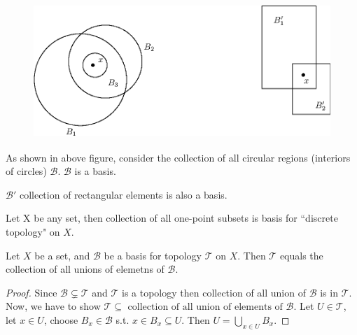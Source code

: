 \documentclass[a4paper,english,12pt]{article}   	%
\begin{document}
\begin{figure}[!h]
 \centering
 \includegraphics[height=2in]{fig134.eps}
\end{figure}

\begin{exmp}
 As shown in above figure, consider the collection of all circular regions (interiors of circles) $\mathcal{B}$. $\mathcal{B}$ is a basis. 
\end{exmp}
\begin{exmp}
 $\mathcal{B}'$ collection of rectangular elements is also a basis. 
\end{exmp}
\begin{exmp}
 Let X be any set, then collection of all one-point subsets is basis for ``discrete topology" on $X$.
\end{exmp}
 \begin{lem}
Let $X$ be a set, and $\mathcal{B}$ be a basis for topology $\mathcal{T}$ on $X$. Then $\mathcal{T}$ equals the collection of all unions of elemetns of $\mathcal{B}$.
\end{lem}
\begin{proof} Since $\mathcal{B}\varsubsetneq\mathcal{T}$ and $\mathcal{T}$ is a topology then collection of all union of $\mathcal{B}$ is in $\mathcal{T}$. Now, we have to show $\mathcal{T}\subseteq \text{ collection of all union of elements of } \mathcal{B}$. Let $U\in \mathcal{T}$, let $x\in U$, choose $B_x\in \mathcal{B}$ s.t. $x\in B_x\subseteq U$. Then $U=\bigcup_{x\in U}B_x$.
\end{proof}
\end{document}

